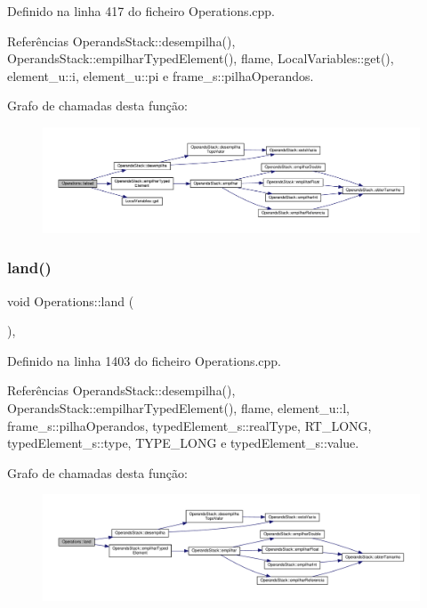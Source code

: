 Definido na linha 417 do ficheiro Operations.\+cpp.



Referências Operands\+Stack\+::desempilha(), Operands\+Stack\+::empilhar\+Typed\+Element(), flame, Local\+Variables\+::get(), element\+\_\+u\+::i, element\+\_\+u\+::pi e frame\+\_\+s\+::pilha\+Operandos.

Grafo de chamadas desta função\+:
\nopagebreak
\begin{figure}[H]
\begin{center}
\leavevmode
\includegraphics[width=350pt]{classOperations_a064f10825e8f0153ef19d466845d3734_cgraph}
\end{center}
\end{figure}
\mbox{\label{classOperations_a6104d728be025abb71570139b988ed4e}} 
\subsubsection{\texorpdfstring{land()}{land()}}
{\footnotesize\ttfamily void Operations\+::land (\begin{DoxyParamCaption}{ }\end{DoxyParamCaption})\hspace{0.3cm}{\ttfamily [static]}, {\ttfamily [private]}}



Definido na linha 1403 do ficheiro Operations.\+cpp.



Referências Operands\+Stack\+::desempilha(), Operands\+Stack\+::empilhar\+Typed\+Element(), flame, element\+\_\+u\+::l, frame\+\_\+s\+::pilha\+Operandos, typed\+Element\+\_\+s\+::real\+Type, R\+T\+\_\+\+L\+O\+NG, typed\+Element\+\_\+s\+::type, T\+Y\+P\+E\+\_\+\+L\+O\+NG e typed\+Element\+\_\+s\+::value.

Grafo de chamadas desta função\+:
\nopagebreak
\begin{figure}[H]
\begin{center}
\leavevmode
\includegraphics[width=350pt]{classOperations_a6104d728be025abb71570139b988ed4e_cgraph}
\end{center}
\end{figure}
\mbox{\label{classOperations_a562813150c331183212c11e5593b83c6}} 
